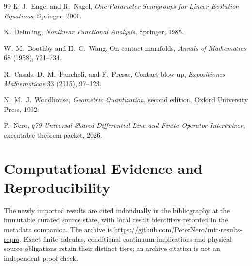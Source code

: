 \documentclass[11pt]{article}
\begin{document}
\begin{thebibliography}{99}
K.-J.~Engel and R.~Nagel,
\newblock \emph{One-Parameter Semigroups for Linear Evolution Equations},
\newblock Springer, 2000.

K.~Deimling,
\newblock \emph{Nonlinear Functional Analysis},
\newblock Springer, 1985.

W.~M.~Boothby and H.~C.~Wang,
\newblock On contact manifolds,
\newblock \emph{Annals of Mathematics} 68 (1958), 721--734.

R.~Casals, D.~M.~Pancholi, and F.~Presas,
\newblock Contact blow-up,
\newblock \emph{Expositiones Mathematicae} 33 (2015), 97--123.

N.~M.~J.~Woodhouse,
\newblock \emph{Geometric Quantization}, second edition,
\newblock Oxford University Press, 1992.

P.~Nero,
\newblock \emph{q79 Universal Shared Differential Line and Finite-Operator
Intertwiner}, executable theorem packet, 2026.

\end{thebibliography}

\section*{Computational Evidence and Reproducibility}
The newly imported results are cited individually in the bibliography at
the immutable curated source state, with local result identifiers recorded
in the metadata companion. The archive is
\url{https://github.com/PeterNero/mtt-results-repro}. Exact finite calculus,
conditional continuum implications and physical source obligations retain
their distinct tiers; an archive citation is not an independent proof check.
\end{document}
